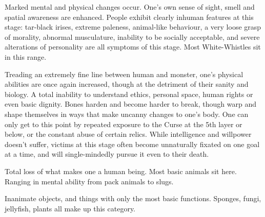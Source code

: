 {Marked mental and physical changes occur. One’s own sense of sight, smell and spatial awareness are enhanced. People exhibit clearly inhuman features at this stage: tar-black irises, extreme paleness, animal-like behaviour, a very loose grasp of morality, abnormal musculature, inability to be socially acceptable, and severe alterations of personality are all symptoms of this stage. Most White-Whistles sit in this range.}

{Treading an extremely fine line between human and monster, one’s physical abilities are once again increased, though at the detriment of their sanity and biology. A total inability to understand ethics, personal space, human rights or even basic dignity. Bones harden and become harder to break, though warp and shape themselves in ways that make uncanny changes to one’s body. One can only get to this point by repeated exposure to the Curse at the 5th layer or below, or the constant abuse of certain relics. While intelligence and willpower doesn’t suffer, victims at this stage often become unnaturally fixated on one goal at a time, and will single-mindedly pursue it even to their death.}

{Total loss of what makes one a human being. Most basic animals sit here. Ranging in mental ability from pack animals to slugs.}

{Inanimate objects, and things with only the most basic functions. Sponges, fungi, jellyfish, plants all make up this category.}

